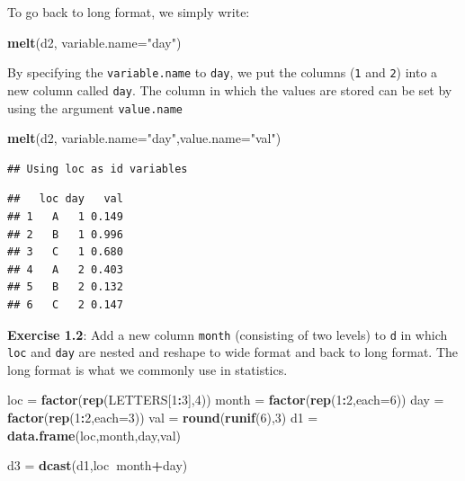\documentclass[11pt,]{article}
\newenvironment{Shaded}{\begin{snugshade}}{\end{snugshade}}
\newcommand{\KeywordTok}[1]{\textcolor[rgb]{0.13,0.29,0.53}{\textbf{#1}}}
\newcommand{\DataTypeTok}[1]{\textcolor[rgb]{0.13,0.29,0.53}{#1}}
\newcommand{\DecValTok}[1]{\textcolor[rgb]{0.00,0.00,0.81}{#1}}
\newcommand{\StringTok}[1]{\textcolor[rgb]{0.31,0.60,0.02}{#1}}
\newcommand{\OperatorTok}[1]{\textcolor[rgb]{0.81,0.36,0.00}{\textbf{#1}}}
\newcommand{\NormalTok}[1]{#1}
\begin{document}
To go back to long format, we simply write:

\begin{Shaded}
\begin{Highlighting}[]
\KeywordTok{melt}\NormalTok{(d2, }\DataTypeTok{variable.name=}\StringTok{"day"}\NormalTok{)}
\end{Highlighting}
\end{Shaded}

By specifying the \texttt{variable.name} to \texttt{day}, we put the
columns (\texttt{1} and \texttt{2}) into a new column called
\texttt{day}. The column in which the values are stored can be set by
using the argument \texttt{value.name}

\begin{Shaded}
\begin{Highlighting}[]
\KeywordTok{melt}\NormalTok{(d2, }\DataTypeTok{variable.name=}\StringTok{"day"}\NormalTok{,}\DataTypeTok{value.name=}\StringTok{"val"}\NormalTok{)}
\end{Highlighting}
\end{Shaded}

\begin{verbatim}
## Using loc as id variables
\end{verbatim}

\begin{verbatim}
##   loc day   val
## 1   A   1 0.149
## 2   B   1 0.996
## 3   C   1 0.680
## 4   A   2 0.403
## 5   B   2 0.132
## 6   C   2 0.147
\end{verbatim}

\textbf{Exercise 1.2}: Add a new column \texttt{month} (consisting of
two levels) to \texttt{d} in which \texttt{loc} and \texttt{day} are
nested and reshape to wide format and back to long format. The long
format is what we commonly use in statistics.

\begin{Shaded}
\begin{Highlighting}[]
\NormalTok{loc =}\StringTok{ }\KeywordTok{factor}\NormalTok{(}\KeywordTok{rep}\NormalTok{(LETTERS[}\DecValTok{1}\OperatorTok{:}\DecValTok{3}\NormalTok{],}\DecValTok{4}\NormalTok{))}
\NormalTok{month =}\StringTok{ }\KeywordTok{factor}\NormalTok{(}\KeywordTok{rep}\NormalTok{(}\DecValTok{1}\OperatorTok{:}\DecValTok{2}\NormalTok{,}\DataTypeTok{each=}\DecValTok{6}\NormalTok{))}
\NormalTok{day =}\StringTok{ }\KeywordTok{factor}\NormalTok{(}\KeywordTok{rep}\NormalTok{(}\DecValTok{1}\OperatorTok{:}\DecValTok{2}\NormalTok{,}\DataTypeTok{each=}\DecValTok{3}\NormalTok{))}
\NormalTok{val =}\StringTok{ }\KeywordTok{round}\NormalTok{(}\KeywordTok{runif}\NormalTok{(}\DecValTok{6}\NormalTok{),}\DecValTok{3}\NormalTok{)}
\NormalTok{d1 =}\StringTok{ }\KeywordTok{data.frame}\NormalTok{(loc,month,day,val)}

\NormalTok{d3 =}\StringTok{ }\KeywordTok{dcast}\NormalTok{(d1,loc}\OperatorTok{~}\NormalTok{month}\OperatorTok{+}\NormalTok{day)}
\end{Highlighting}
\end{Shaded}
\end{document}
